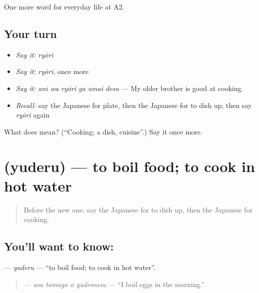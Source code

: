 \begin{grammarlens}[title={What you've built}]
One more word for everyday life at A2.
\end{grammarlens}

\subsection*{Your turn}
\begin{itemize}
\raggedright
  \item \emph{Say it:} \emph{ryōri}
  \item \emph{Say it:} \emph{ryōri}, once more
  \item \emph{Say it:} \emph{ani wa ryōri ga umai desu} — My older brother is good at cooking.
  \item \emph{Recall:} say the Japanese for plate, then the Japanese for to dish up, then say \emph{ryōri} again
\end{itemize}

\begin{tcolorbox}[breakable,colback=teal!4,colframe=teal!35!black,title={Before you move on}]
What does  mean? (\textquotedblleft{}Cooking; a dish, cuisine\textquotedblright{}.) Say it once more.
\end{tcolorbox}
\section[\texorpdfstring{\ja{ゆでる} (yuderu)}{ゆでる (yuderu)}]{ (yuderu) — to boil food; to cook in hot water}

\label{lesson:JA-C175-yuderu}



\begin{quote}
Before the new one: say the Japanese for to dish up, then the Japanese for cooking.
\end{quote}

\subsection*{You'll want to know: }
\textbf{} — \emph{yuderu} — \textquotedblleft{}to boil food; to cook in hot water\textquotedblright{}.

\begin{quote}
\textbf{  } — \emph{asa tamago o yudemasu} — \textquotedblleft{}I boil eggs in the morning.\textquotedblright{}
\end{quote}

